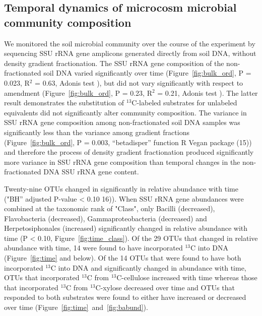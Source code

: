 \subsection{Temporal dynamics of microcosm microbial community composition}
We monitored the soil microbial community over the course of the experiment by
sequencing SSU rRNA gene amplicons generated directly from soil DNA, without
density gradient fractionation. The SSU rRNA gene composition of the
non-fractionated soil DNA varied significantly over time (Figure~\ref{fig:bulk_ord},
P = 0.023, R$^{2}$ = 0.63, Adonis test \citet{Anderson2001a}), but did not
vary significantly with respect to amendment (Figure~\ref{fig:bulk_ord}, P = 0.23, R$^{2}$
= 0.21, Adonis test \citet{Anderson2001a}). The latter result demonstrates the substitution
of $^{13}$C-labeled substrates for unlabeled equivalents did not
significantly alter community composition. The variance in SSU rRNA gene
composition among non-fractionated soil DNA samples was significantly less
than the variance among gradient fractions (Figure~\ref{fig:bulk_ord}, P = 0.003,
“betadisper” function R Vegan package \citet{oksanen2007vegan} (15)) and
therefore the process of density gradient fractionation produced
significantly more variance in SSU rRNA gene composition than temporal
changes in the non-fractionated DNA SSU rRNA gene content.

Twenty-nine OTUs changed in significantly in relative abundance with time ("BH”
adjusted P-value < 0.10 16)). When SSU rRNA gene abundances were combined at
the taxonomic rank of "Class", only Bacilli
(decreased), Flavobacteria (decreased), Gammaproteobacteria (decreased) and
Herpetosiphonales (increased) significantly changed in relative abundance with
time (P < 0.10, Figure~\ref{fig:time_class}). Of the 29 OTUs that changed in relative abundance
with time, 14 were found to have incorporated $^{13}$C into DNA (Figure~\ref{fig:time} and
below). Of the 14 OTUs that were found to have both incorporated $^{13}$C into
DNA and significantly changed in abundance with time, OTUs that incorporated
$^{13}$C from $^{13}$C-cellulose increased with time whereas those that
incorporated $^{13}$C from $^{13}$C-xylose decreased over time and OTUs that
responded to both substrates were found to either have increased or decreased
over time (Figure~\ref{fig:time}~and~\ref{fig:babund}).

